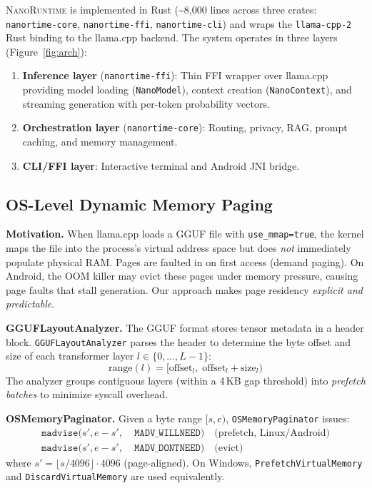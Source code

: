 \documentclass[11pt]{article}
\newcommand{\nanort}{\textsc{NanoRuntime}}
\begin{document}
\nanort{} is implemented in Rust (\textasciitilde{}8,000 lines across three
crates: \texttt{nanortime-core}, \texttt{nanortime-ffi},
\texttt{nanortime-cli}) and wraps the
\texttt{llama-cpp-2} Rust binding to the llama.cpp backend.
The system operates in three layers (Figure~\ref{fig:arch}):

\begin{enumerate}
  \item \textbf{Inference layer} (\texttt{nanortime-ffi}):
    Thin FFI wrapper over llama.cpp providing model loading
    (\texttt{NanoModel}), context creation (\texttt{NanoContext}),
    and streaming generation with per-token probability vectors.
  \item \textbf{Orchestration layer} (\texttt{nanortime-core}):
    Routing, privacy, RAG, prompt caching, and memory management.
  \item \textbf{CLI/FFI layer}: Interactive terminal and Android JNI bridge.
\end{enumerate}

\subsection{OS-Level Dynamic Memory Paging}
\label{sec:paging}

\textbf{Motivation.}
When llama.cpp loads a GGUF file with \texttt{use\_mmap=true},
the kernel maps the file into the process's virtual address space
but does \emph{not} immediately populate physical RAM.
Pages are faulted in on first access (demand paging).
On Android, the OOM killer may evict these pages under memory pressure,
causing page faults that stall generation.
Our approach makes page residency \emph{explicit and predictable}.

\textbf{GGUFLayoutAnalyzer.}
The GGUF format stores tensor metadata in a header block.
\texttt{GGUFLayoutAnalyzer} parses the header to determine the byte
offset and size of each transformer layer $l \in \{0, \ldots, L{-}1\}$:
\begin{equation}
  \text{range}(l) = [\text{offset}_l,\; \text{offset}_l + \text{size}_l)
  \label{eq:layout}
\end{equation}
The analyzer groups contiguous layers (within a 4\,KB gap threshold)
into \emph{prefetch batches} to minimize syscall overhead.

\textbf{OSMemoryPaginator.}
Given a byte range $[s, e)$, \texttt{OSMemoryPaginator} issues:
\begin{align}
  \texttt{madvise}(s', e-s',\; &\texttt{MADV\_WILLNEED})
    \quad \text{(prefetch, Linux/Android)} \label{eq:willneed}\\
  \texttt{madvise}(s', e-s',\; &\texttt{MADV\_DONTNEED})
    \quad \text{(evict)} \label{eq:dontneed}
\end{align}
where $s' = \lfloor s / 4096 \rfloor \cdot 4096$ (page-aligned).
On Windows, \texttt{PrefetchVirtualMemory} and
\texttt{DiscardVirtualMemory} are used equivalently.
\end{document}
